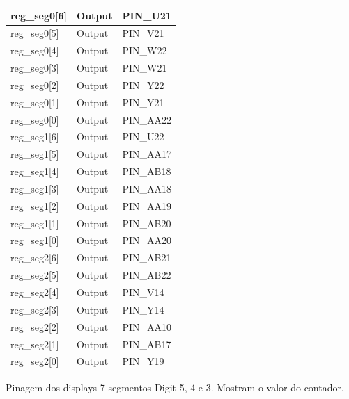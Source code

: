 \documentclass[12pt, a4paper]{article}
\begin{document}
	\begin{table}[H]
		\begin{center}
			\begin{tabular}{|l|l|l|}
				\hline
				reg\_seg0{[}6{]} & Output & PIN\_U21  \\ \hline
				reg\_seg0{[}5{]} & Output & PIN\_V21  \\ \hline
				reg\_seg0{[}4{]} & Output & PIN\_W22  \\ \hline
				reg\_seg0{[}3{]} & Output & PIN\_W21  \\ \hline
				reg\_seg0{[}2{]} & Output & PIN\_Y22  \\ \hline
				reg\_seg0{[}1{]} & Output & PIN\_Y21  \\ \hline
				reg\_seg0{[}0{]} & Output & PIN\_AA22 \\ \hline
				reg\_seg1{[}6{]} & Output & PIN\_U22  \\ \hline
				reg\_seg1{[}5{]} & Output & PIN\_AA17 \\ \hline
				reg\_seg1{[}4{]} & Output & PIN\_AB18 \\ \hline
				reg\_seg1{[}3{]} & Output & PIN\_AA18 \\ \hline
				reg\_seg1{[}2{]} & Output & PIN\_AA19 \\ \hline
				reg\_seg1{[}1{]} & Output & PIN\_AB20 \\ \hline
				reg\_seg1{[}0{]} & Output & PIN\_AA20 \\ \hline
				reg\_seg2{[}6{]} & Output & PIN\_AB21 \\ \hline
				reg\_seg2{[}5{]} & Output & PIN\_AB22 \\ \hline
				reg\_seg2{[}4{]} & Output & PIN\_V14  \\ \hline
				reg\_seg2{[}3{]} & Output & PIN\_Y14  \\ \hline
				reg\_seg2{[}2{]} & Output & PIN\_AA10 \\ \hline
				reg\_seg2{[}1{]} & Output & PIN\_AB17 \\ \hline
				reg\_seg2{[}0{]} & Output & PIN\_Y19  \\ \hline
			\end{tabular}
		\end{center}
	\end{table}
	
	Pinagem dos displays 7 segmentos Digit 5, 4 e 3. Mostram o valor do contador.
	
\end{document}

